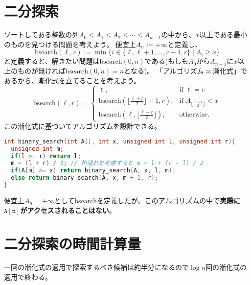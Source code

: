 \documentclass[a4paper,twoside,onecolumn,openany,article,10pt]{memoir}
\theoremstyle{remark}
\begin{document}
\section{二分探索}
ソートしてある整数の列$A_0\le A_1\le A_2\le \dotsb\le A_{n-1}$の中から、$x$以上である最小のものを見つける問題を考えよう。
便宜上$A_n := +\infty$と定義し、
\begin{equation*}
\mathrm{bsearch}(\ell, r) := \min\bigl\{i\in\{\ell,\ell+1,\dotsc,r-1,r\}\mid A_i\ge x\bigr\}
\end{equation*}
と定義すると、解きたい問題は$\mathrm{bsearch}(0,n)$である(もしも$A_0$から$A_{n-1}$に$x$以上のものが無ければ$\mathrm{bsearch}(0,n)=n$となる)。
「アルゴリズム$\approx$漸化式」であるから、漸化式を立てることを考えよう。
\begin{equation*}
\mathrm{bsearch}(\ell, r) =
\begin{cases}
\ell,& \text{if } \ell = r\\
\mathrm{bsearch}(\lfloor \frac{\ell + r}2\rfloor+1, r),& \text{if } A_{\lfloor\frac{\ell + r}2\rfloor} < x\\
\mathrm{bsearch}(\ell, \lfloor \frac{\ell + r}2\rfloor),& \text{otherwise.}
\end{cases}
\end{equation*}
この漸化式に基づいてアルゴリズムを設計できる。

\begin{lstlisting}[basicstyle=\ttfamily\normalsize,showstringspaces=false,language=C,frame=single]
int binary_search(int A[], int x, unsigned int l, unsigned int r){
  unsigned int m;
  if(l >= r) return l;
  m = (l + r) / 2; // 桁溢れを考慮すると m = l + (r - l) / 2
  if(A[m] >= x) return binary_search(A, x, l, m);
  else return binary_search(A, x, m + 1, r);
}
\end{lstlisting}
便宜上$A_n=+\infty$として\textrm{bsearch}を定義したが、このアルゴリズムの中で\textbf{実際に$\mathtt{A[n]}$がアクセスされることはない}。

\section{二分探索の時間計算量}
一回の漸化式の適用で探索するべき候補は約半分になるので$\log n$回の漸化式の適用で終わる。
\end{document}
